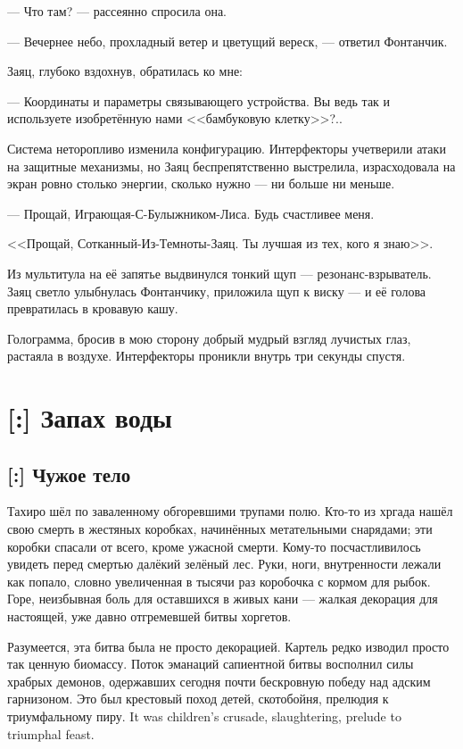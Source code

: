 --- Что там? --- рассеянно спросила она.

--- Вечернее небо, прохладный ветер и цветущий вереск, --- ответил Фонтанчик.

Заяц, глубоко вздохнув, обратилась ко мне:

--- Координаты и параметры связывающего устройства.
Вы ведь так и используете изобретённую нами <<бамбуковую клетку>>?..

Система неторопливо изменила конфигурацию.
Интерфекторы учетверили атаки на защитные механизмы, но Заяц беспрепятственно выстрелила, израсходовала на экран ровно столько энергии, сколько нужно --- ни больше ни меньше.

--- Прощай, Играющая-С-Булыжником-Лиса.
Будь счастливее меня.

<<Прощай, Сотканный-Из-Темноты-Заяц.
Ты лучшая из тех, кого я знаю>>.

Из мультитула на её запятье выдвинулся тонкий щуп --- резонанс-взрыватель.
Заяц светло улыбнулась Фонтанчику, приложила щуп к виску --- и её голова превратилась в кровавую кашу.

Голограмма, бросив в мою сторону добрый мудрый взгляд лучистых глаз, растаяла в воздухе.
Интерфекторы проникли внутрь три секунды спустя.

\chapter{[:] Запах воды}

\section{[:] Чужое тело}

Тахиро шёл по заваленному обгоревшими трупами полю.
Кто-то из хргада нашёл свою смерть в жестяных коробках, начинённых метательными снарядами;
эти коробки спасали от всего, кроме ужасной смерти.
Кому-то посчастливилось увидеть перед смертью далёкий зелёный лес.
Руки, ноги, внутренности лежали как попало, словно увеличенная в тысячи раз коробочка с кормом для рыбок.
Горе, неизбывная боль для оставшихся в живых кани --- жалкая декорация для настоящей, уже давно отгремевшей битвы хоргетов.

Разумеется, эта битва была не просто декорацией.
Картель редко изводил просто так ценную биомассу.
Поток эманаций сапиентной битвы восполнил силы храбрых демонов, одержавших сегодня почти бескровную победу над адским гарнизоном.
{Это был крестовый поход детей, скотобойня, прелюдия к триумфальному пиру.}
{It was children's crusade, slaughtering, prelude to triumphal feast.}

